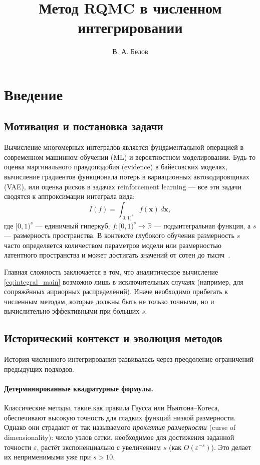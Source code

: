 \documentclass[12pt, a4paper]{article}
\title{Метод RQMC в численном интегрировании}
\author{В. А. Белов}
\theoremstyle{plain}
\theoremstyle{definition}
\theoremstyle{remark}
\newcommand{\RR}{\mathbb{R}}
\newcommand{\II}{[0, 1)}
\newcommand{\vx}{\boldsymbol{x}}
\begin{document}
\maketitle

\tableofcontents
\newpage

\section*{Введение}
\label{sec:intro}

\subsection*{Мотивация и постановка задачи}
Вычисление многомерных интегралов является фундаментальной операцией в современном машинном обучении (ML) и вероятностном моделировании. Будь то оценка маргинального правдоподобия (evidence) в байесовских моделях, вычисление градиентов функционала потерь в вариационных автокодировщиках (VAE), или оценка рисков в задачах reinforcement learning --- все эти задачи сводятся к аппроксимации интеграла вида:
\begin{equation}
    I(f) = \int_{\II^s} f(\vx) \, d\vx,
    \label{eq:integral_main}
\end{equation}
где $\II^s$ --- единичный гиперкуб, $f \colon \II^s \to \RR$ --- подынтегральная функция, а $s$ --- размерность пространства. В контексте глубокого обучения размерность $s$ часто определяется количеством параметров модели или размерностью латентного пространства и может достигать значений от сотен до тысяч~\cite{buchholz2018quasi, gerber2015sequential}.

Главная сложность заключается в том, что аналитическое вычисление \eqref{eq:integral_main} возможно лишь в исключительных случаях (например, для сопряжённых априорных распределений). Иначе необходимо прибегать к численным методам, которые должны быть не только точными, но и вычислительно эффективными при больших $s$.

\subsection*{Исторический контекст и эволюция методов}
История численного интегрирования развивалась через преодоление ограничений предыдущих подходов.

\paragraph*{Детерминированные квадратурные формулы.}
Классические методы, такие как правила Гаусса или Ньютона--Котеса, обеспечивают высокую точность для гладких функций низкой размерности. Однако они страдают от так называемого \textit{проклятия размерности} (curse of dimensionality): число узлов сетки, необходимое для достижения заданной точности $\varepsilon$, растёт экспоненциально с увеличением $s$ (как $O(\varepsilon^{-s})$). Это делает их неприменимыми уже при $s > 10$.
\end{document}
